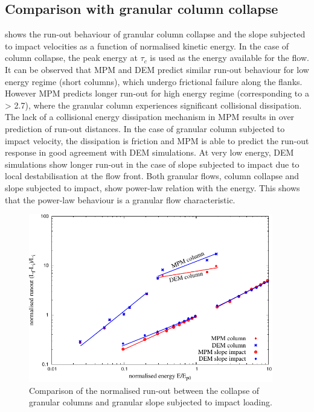\subsection{Comparison with granular column collapse}

 shows the run-out behaviour of granular column 
collapse and the slope subjected to impact velocities as a function of 
normalised kinetic energy. In the case of column collapse, the peak energy at 
$\tau_c$ is used as the energy available for the flow. It can be observed that 
MPM and DEM predict similar run-out behaviour for low energy regime (short 
columns), which undergo frictional failure along the flanks. However MPM 
predicts longer run-out for high energy regime (corresponding to a > 2.7), 
where the granular column experiences significant collisional dissipation. The 
lack of a collisional energy dissipation mechanism in MPM results in over 
prediction of run-out distances. In the case of granular column subjected to 
impact velocity, the dissipation is friction and MPM is able to predict the 
run-out response in good agreement with DEM simulations. At very low energy, 
DEM simulations show longer run-out in the case of slope subjected to impact 
due to local destabilisation at the flow front. Both granular flows, column 
collapse and slope subjected to impact, show power-law relation with the 
energy. This shows that the power-law behaviour is a granular flow 
characteristic.

\begin{figure}[tbhp]
\centering
\includegraphics[width=0.95\textwidth]{Runout_Slope_Column}
\caption{Comparison of the normalised run-out between the collapse of granular 
columns and granular slope subjected to impact loading.}
\label{fig:Runout_Slope_Column}
\end{figure}


